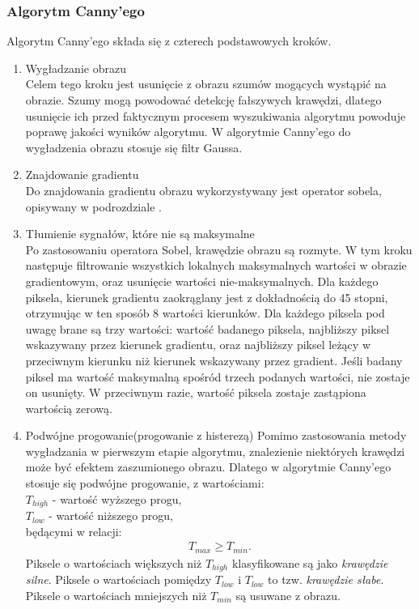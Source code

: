 \subsubsection{Algorytm Canny'ego}
Algorytm Canny'ego składa się z czterech podstawowych kroków.
\begin{enumerate}
\item Wygładzanie obrazu \\
  Celem tego kroku jest usunięcie z obrazu szumów mogących wystąpić na obrazie. Szumy mogą powodować detekcję fałszywych krawędzi, dlatego usunięcie ich przed faktycznym procesem wyszukiwania algorytmu powoduje poprawę jakości wyników algorytmu. W algorytmie Canny'ego do wygładzenia obrazu stosuje się filtr Gaussa. 
\item Znajdowanie gradientu \\
  Do znajdowania gradientu obrazu wykorzystywany jest operator sobela, opisywany w podrozdziale .
\item Tłumienie sygnałów, które nie są maksymalne \\
  Po zastosowaniu operatora Sobel, krawędzie obrazu są rozmyte. W tym kroku następuje filtrowanie wszystkich lokalnych maksymalnych wartości w obrazie gradientowym, oraz usunięcie wartości nie-maksymalnych. Dla każdego piksela, kierunek gradientu zaokrąglany jest z dokładnością do 45 stopni, otrzymując w ten sposób 8 wartości kierunków. Dla każdego piksela pod uwagę brane są trzy wartości: wartość badanego piksela, najbliższy piksel wskazywany przez kierunek gradientu, oraz najbliższy piksel leżący w przeciwnym kierunku niż kierunek wskazywany przez gradient. Jeśli badany piksel ma wartość maksymalną spośród trzech podanych wartości, nie zostaje on usunięty. W przeciwnym razie, wartość piksela zostaje zastąpiona wartością zerową.
\item Podwójne progowanie(progowanie z histerezą)
  Pomimo zastosowania metody wygładzania w pierwszym etapie algorytmu, znalezienie niektórych krawędzi może być efektem zaszumionego obrazu. Dlatego w algorytmie Canny'ego stosuje się podwójne progowanie, z wartościami:\\
$T_{high}$ - wartość wyższego progu,\\
$T_{low}$ - wartość niższego progu,\\
będącymi w relacji:
\begin{gather*}
  T_{max} \geq T_{min}.
\end{gather*}
Piksele o wartościach większych niż $T_{high}$ klasyfikowane są jako \textit{krawędzie silne}. Piksele o wartościach pomiędzy $T_{low}$ i $T_{low}$ to tzw. \textit{krawędzie słabe}. Piksele o wartościach mniejszych niż $T_{min}$ są usuwane z obrazu.

\end{enumerate}

